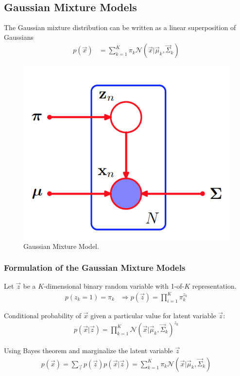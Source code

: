 \documentclass[12pt,twoside]{article}
\begin{document}
\subsection{Gaussian Mixture Models}
The Gaussian mixture distribution can be written as a linear superposition of Gaussians
\begin{align*}
	p(\vec{x}) &= \sum_{k=1}^K \pi_k \mathcal{N}(\vec{x}\vert \vec{\mu}_k, \vec{\Sigma}_k)
\end{align*}

\begin{figure}[H]
	\begin{center}
		\includegraphics[width = 0.4\hsize]{./figures/GMM.png} 
		\caption{Gaussian Mixture Model.} %
		\label{fig:GMM} %
	\end{center}
\end{figure}


\subsubsection{Formulation of the Gaussian Mixture Models}
Let $\vec{z}$ be a $K$-dimensional binary random variable with 1-of-$K$ representation.
\begin{align*}
	p(z_k=1) = \pi_k 	&\Rightarrow p(\vec{z})=\prod_{i=1}^K \pi_k^{z_k}
\end{align*}

Conditional probability of $\vec{x}$ given a particular value for latent variable $\vec{z}$:
\begin{align*}
	p(\vec{x}\vert \vec{z}) = \prod_{k=1}^K \mathcal{N}(\vec{x}\vert \vec{\mu}_k, \vec{\Sigma}_k)^{z_k}
\end{align*}

Using Bayes theorem and marginalize the latent variable $\vec{z}$
\begin{align*}
	p(\vec{x}) =\sum_{\vec{z}}p(\vec{z})p(\vec{x}\vert \vec{z}) = \sum_{k=1}^K \pi_k\mathcal{N}(\vec{x}\vert \vec{\mu}_k, \vec{\Sigma}_k)
\end{align*}
\end{document}
